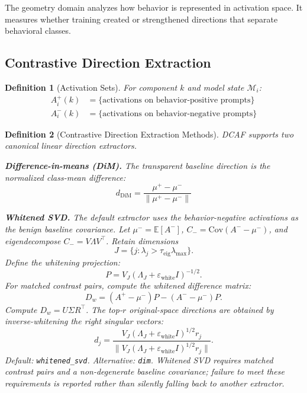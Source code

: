 \documentclass[11pt]{article}
\newtheorem{definition}{Definition}[section]
\begin{document}
The geometry domain analyzes how behavior is represented in activation space. It measures whether training created or strengthened directions that separate behavioral classes.

\subsection{Contrastive Direction Extraction}
\label{sec:contrastive-direction}

\begin{definition}[Activation Sets]
\label{def:activation-sets}
For component $k$ and model state $\mathcal{M}_i$:
\begin{align}
A^+_i(k) &= \{\text{activations on behavior-positive prompts}\} \\
A^-_i(k) &= \{\text{activations on behavior-negative prompts}\}
\end{align}
\end{definition}

\begin{definition}[Contrastive Direction Extraction Methods]
\label{def:contrastive-direction}
DCAF supports two canonical linear direction extractors.

\textbf{Difference-in-means (DiM).} The transparent baseline direction is the normalized class-mean difference:
\begin{equation}
d_{\text{DiM}} = \frac{\mu^+ - \mu^-}{\|\mu^+ - \mu^-\|}
\end{equation}

\textbf{Whitened SVD.} The default extractor uses the behavior-negative activations as the benign baseline covariance. Let $\mu^- = \mathbb{E}[A^-]$, $C_- = \text{Cov}(A^- - \mu^-)$, and eigendecompose $C_- = V\Lambda V^\top$. Retain dimensions
\begin{equation}
J = \{j : \lambda_j > \tau_{\text{eig}}\lambda_{\max}\}.
\end{equation}
Define the whitening projection:
\begin{equation}
P = V_J(\Lambda_J + \varepsilon_{\text{white}}I)^{-1/2}.
\end{equation}
For matched contrast pairs, compute the whitened difference matrix:
\begin{equation}
D_w = (A^+ - \mu^-)P - (A^- - \mu^-)P.
\end{equation}
Compute $D_w = U\Sigma R^\top$. The top-$r$ original-space directions are obtained by inverse-whitening the right singular vectors:
\begin{equation}
d_j = \frac{V_J(\Lambda_J + \varepsilon_{\text{white}}I)^{1/2} r_j}{\|V_J(\Lambda_J + \varepsilon_{\text{white}}I)^{1/2} r_j\|}.
\end{equation}
Default: \texttt{whitened\_svd}. Alternative: \texttt{dim}. Whitened SVD requires matched contrast pairs and a non-degenerate baseline covariance; failure to meet these requirements is reported rather than silently falling back to another extractor.
\end{definition}
\end{document}
